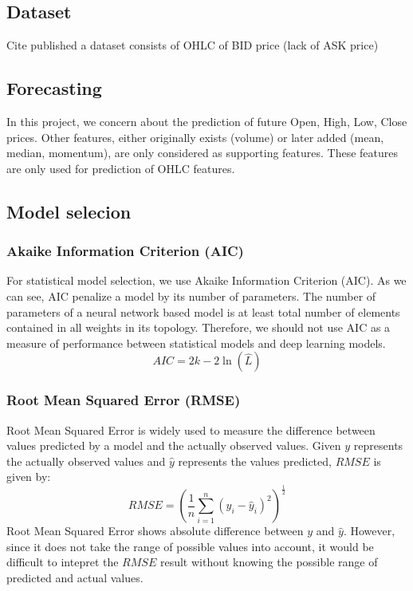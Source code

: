\documentclass[12pt]{article}
\begin{document}
\subsection{Dataset}
Cite published a dataset consists of OHLC of BID price (lack of ASK price)


\subsection{Forecasting}
In this project, we concern about the prediction of future Open, High, Low,
Close prices. Other features, either originally exists (volume) or later added
(mean, median, momentum), are only considered as supporting features. These
features are only used for prediction of OHLC features.

\subsection{Model selecion}
\subsubsection{Akaike Information Criterion (AIC)}
For statistical model selection, we use Akaike Information Criterion (AIC). 
As we can see, AIC penalize a model by its number of parameters. The
number of parameters of a neural network based model is at least total number of
elements contained in all weights in its topology. Therefore, we should not use
AIC as a measure of performance between statistical models and deep learning
models.
$$
AIC = 2k -2\ln(\hat{L})
$$

\subsubsection{Root Mean Squared Error (RMSE)}
Root Mean Squared Error is widely used to measure the difference between values
predicted by a model and the actually observed values. Given $y$ represents the
actually observed values and $\hat{y}$ represents the values predicted, $RMSE$
is given by:
$$
RMSE = \left( \frac{1}{n}\sum _{i=1}^{n}(y_i -\hat{y}_i)^2 \right)^\frac{1}{2}
$$
Root Mean Squared Error shows absolute difference between $y$ and $\hat{y}$.
However, since it does not take the range of possible values into account, it
would be difficult to intepret the $RMSE$ result without knowing the possible
range of predicted and actual values. 
\end{document}
